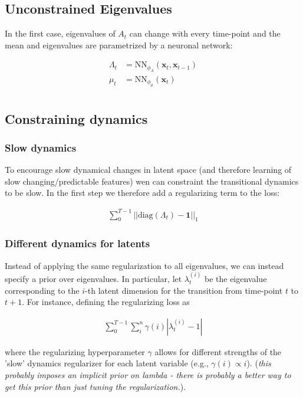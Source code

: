 \subsection{Unconstrained Eigenvalues}

In the first case, eigenvalues of $A_t$ can change with every time-point and the mean and eigenvalues are parametrized by a neuronal network:

\begin{align*}
    \Lambda_t & = \text{NN}_{\phi_\Lambda}(\textbf{x}_t, \textbf{x}_{t-1}) \\
    \mu_t & = \text{NN}_{\phi_\mu}(\textbf{x}_t) \\
\end{align*}

\subsection{Constraining dynamics}

\subsubsection{Slow dynamics}

To encourage slow dynamical changes in latent space (and therefore learning of slow changing/predictable features) wen can  constraint the transitional dynamics to be slow. In the first step we therefore add a regularizing term to the loss:

\begin{align*}
    \sum_0^{T-1} ||\text{diag}(\Lambda_t) - \mathbf{1}||_1
\end{align*}

\subsubsection{Different dynamics for latents}

Instead of applying the same regularization to all eigenvalues, we can instead specify a prior over eigenvalues. In particular, let $\lambda^{(i)}_t$ be the eigenvalue corresponding to the $i$-th latent dimension for the transition from time-point $t$ to $t+1$. For instance, defining the regularizing loss as 

\begin{align*}
    \sum_0^{T-1} \sum_i^{n} \gamma(i) |\lambda^{(i)}_t - 1|
\end{align*}

where the regularizing hyperparameter $\gamma$ allows for different strengths of the 'slow' dynamics regularizer for each latent variable (e.g., $\gamma(i) \propto i$). (\textit{this probably imposes an implicit prior on lambda - there is probably a better way to get this prior than just tuning the regularization.}).

